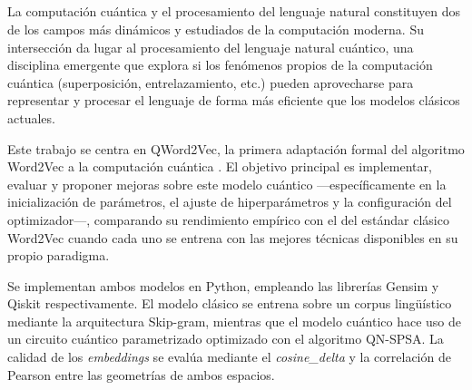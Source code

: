 


\begin{center}
  {\large\bfseries \myTitle}\\
\end{center}
\begin{center}
  \myName\\
\end{center}

\\

\vspace{0.7cm}
\\

La computación cuántica y el procesamiento del lenguaje natural constituyen dos de los campos más dinámicos y estudiados de la computación moderna. Su intersección da lugar al procesamiento del lenguaje natural cuántico, una disciplina emergente que explora si los fenómenos propios de la computación cuántica (superposición, entrelazamiento, etc.) pueden aprovecharse para representar y procesar el lenguaje de forma más eficiente que los modelos clásicos actuales.

Este trabajo se centra en QWord2Vec, la primera adaptación formal del algoritmo Word2Vec a la computación cuántica \cite{ohno_qword2vec_2025}. El objetivo principal es implementar, evaluar y proponer mejoras sobre este modelo cuántico —específicamente en la inicialización de parámetros, el ajuste de hiperparámetros y la configuración del optimizador—, comparando su rendimiento empírico con el del estándar clásico Word2Vec cuando cada uno se entrena con las mejores técnicas disponibles en su propio paradigma.

Se implementan ambos modelos en Python, empleando las librerías Gensim y Qiskit respectivamente. El modelo clásico se entrena sobre un corpus lingüístico mediante la arquitectura Skip-gram, mientras que el modelo cuántico hace uso de un circuito cuántico parametrizado optimizado con el algoritmo QN-SPSA. La calidad de los \textit{embeddings} se evalúa mediante el \textit{cosine\_delta} y la correlación de Pearson entre las geometrías de ambos espacios.

